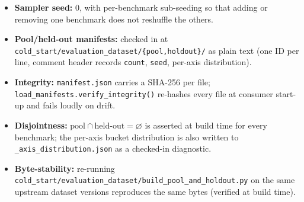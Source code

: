 \begin{itemize}
  \item \textbf{Sampler seed:} $0$, with per-benchmark sub-seeding so
        that adding or removing one benchmark does not reshuffle the
        others.
  \item \textbf{Pool/held-out manifests:} checked in at
        \texttt{cold\_start/evaluation\_dataset/\{pool,holdout\}/} as
        plain text (one ID per line, comment header records
        \texttt{count}, \texttt{seed}, per-axis distribution).
  \item \textbf{Integrity:} \texttt{manifest.json} carries a SHA-256
        per file; \texttt{load\_manifests.verify\_integrity()}
        re-hashes every file at consumer start-up and fails loudly on
        drift.
  \item \textbf{Disjointness:} $\text{pool}\cap\text{held-out}=\varnothing$
        is asserted at build time for every benchmark; the per-axis
        bucket distribution is also written to
        \texttt{\_axis\_distribution.json} as a checked-in diagnostic.
  \item \textbf{Byte-stability:} re-running
        \texttt{cold\_start/evaluation\_dataset/build\_pool\_and\_holdout.py}
        on the same upstream dataset versions reproduces the same
        bytes (verified at build time).
\end{itemize}
